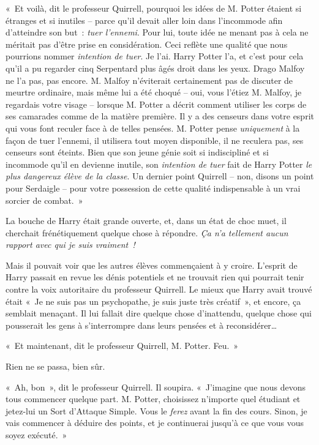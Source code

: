 «~Et voilà, dit le professeur Quirrell, pourquoi les idées de M. Potter étaient si étranges et si inutiles -- parce qu'il devait aller loin dans l'incommode afin d'atteindre son but~: \emph{tuer l'ennemi}. Pour lui, toute idée ne menant pas à cela ne méritait pas d'être prise en considération. Ceci reflète une qualité que nous pourrions nommer \emph{intention de tuer}. Je l'ai. Harry Potter l'a, et c'est pour cela qu'il a pu regarder cinq Serpentard plus âgés droit dans les yeux. Drago Malfoy ne l'a pas, pas encore. M. Malfoy n'éviterait certainement pas de discuter de meurtre ordinaire, mais même lui a été choqué -- oui, vous l'étiez M. Malfoy, je regardais votre visage -- lorsque M. Potter a décrit comment utiliser les corps de ses camarades comme de la matière première. Il y a des censeurs dans votre esprit qui vous font reculer face à de telles pensées. M. Potter pense \emph{uniquement} à la façon de tuer l'ennemi, il utilisera tout moyen disponible, il ne reculera pas, ses censeurs sont éteints. Bien que son jeune génie soit si indiscipliné et si incommode qu'il en devienne inutile, son \emph{intention de tuer} fait de Harry Potter \emph{le plus dangereux élève de la classe}. Un dernier point Quirrell -- non, disons un point pour Serdaigle -- pour votre possession de cette qualité indispensable à un vrai sorcier de combat.~»

La bouche de Harry était grande ouverte, et, dans un état de choc muet, il cherchait frénétiquement quelque chose à répondre. \emph{Ça n'a tellement aucun rapport avec qui je suis vraiment~!}

Mais il pouvait voir que les autres élèves commençaient à y croire. L'esprit de Harry passait en revue les dénis potentiels et ne trouvait rien qui pourrait tenir contre la voix autoritaire du professeur Quirrell. Le mieux que Harry avait trouvé était «~Je ne suis pas un psychopathe, je suis juste très créatif~», et encore, ça semblait menaçant. Il lui fallait dire quelque chose d'inattendu, quelque chose qui pousserait les gens à s'interrompre dans leurs pensées et à reconsidérer…

«~Et maintenant, dit le professeur Quirrell, M. Potter. Feu.~»

Rien ne se passa, bien sûr.

«~Ah, bon~», dit le professeur Quirrell. Il soupira. «~J'imagine que nous devons tous commencer quelque part. M. Potter, choisissez n'importe quel étudiant et jetez-lui un Sort d'Attaque Simple. Vous le \emph{ferez} avant la fin des cours. Sinon, je vais commencer à déduire des points, et je continuerai jusqu'à ce que vous vous soyez exécuté.~»

